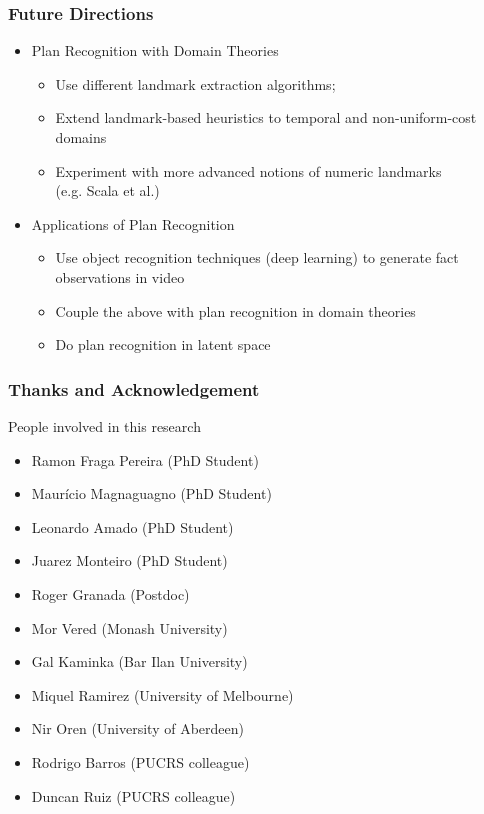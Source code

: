 \documentclass[usenames,dvipsnames]{beamer}
\begin{document}
\begin{frame}[c]\frametitle{Future Directions}
	\begin{itemize}
		\item Plan Recognition with Domain Theories
        \begin{itemize}
        	\item Use different landmark extraction algorithms;
			\item Extend landmark-based heuristics to temporal and non-uniform-cost domains
            \item Experiment with more advanced notions of numeric landmarks \\(e.g. Scala et al.)
        \end{itemize}
        \item Applications of Plan Recognition
        \begin{itemize}
        	\item Use object recognition techniques (deep learning) to generate fact observations in video
            \item Couple the above with plan recognition in domain theories
            \item Do plan recognition in latent space
        \end{itemize}
	\end{itemize}
\end{frame}

\begin{frame}[c]\frametitle{Thanks and Acknowledgement}
	People involved in this research
	\begin{itemize}
		\item Ramon Fraga Pereira (PhD Student)
		\item Maurício Magnaguagno (PhD Student)
		\item Leonardo Amado (PhD Student)
		\item Juarez Monteiro (PhD Student)
		\item Roger Granada (Postdoc)
		\item Mor Vered (Monash University)
		\item Gal Kaminka (Bar Ilan University)
		\item Miquel Ramirez (University of Melbourne) 
		\item Nir Oren (University of Aberdeen)
		\item Rodrigo Barros (PUCRS colleague) 
		\item Duncan Ruiz (PUCRS colleague) 
	\end{itemize}
\end{frame}
\end{document}
